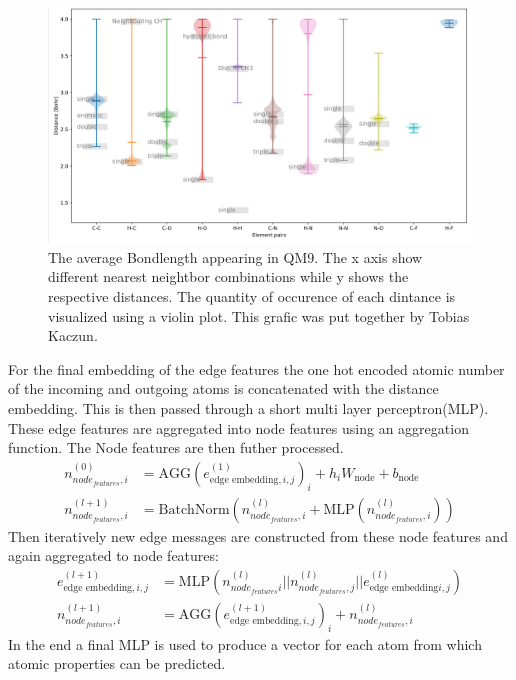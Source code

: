 \begin{figure}
    \centering
    \includegraphics[width=1.\textwidth]{chapters/foundations/images_foundation/bondlength}
    \caption{The average Bondlength appearing in QM9\cite{ramakrishnan2014quantum}. The x axis show different nearest neightbor combinations while y shows the respective distances. The quantity of occurence of each dintance is visualized using a violin plot. This grafic was put together by Tobias Kaczun.}
    \label{fig:bond_length}
\end{figure}
For the final embedding of the edge features the one hot encoded atomic number of the incoming and outgoing atoms is concatenated with the distance embedding. This is then passed through a short multi layer perceptron(MLP).
These edge features are aggregated into node features using an aggregation function. The Node features are then futher processed.
\begin{align}
    n_{node_{features},i}^{(0)} &= \text{AGG}(e_{\text{edge embedding},i,j}^{(1)})_i + h_{i}W_{\text{node}} + b_{\text{node}} \\
    n_{node_{features},i}^{(l+1)} &= \text{BatchNorm}(n_{node_{features},i}^{(l)} + \text{MLP}(n_{node_{features},i}^{(l)}))
\end{align}
Then iteratively new edge messages are constructed from these node features and again aggregated to node features:
\begin{align}
    e_{\text{edge embedding},i,j}^{(l+1)} &= \text{MLP}(n_{node_{features}i}^{(l)}||n_{node_{features},j}^{(l)}||e_{\text{edge embedding}i,j}^{(l)})\\
    n_{node_{features},i}^{(l+1)} &= \text{AGG}(e_{\text{edge embedding},i,j}^{(l+1)})_i + n_{node_{features},i}^{(l)}
\end{align}
In the end a final MLP is used to produce a vector for each atom from which atomic properties can be predicted.

